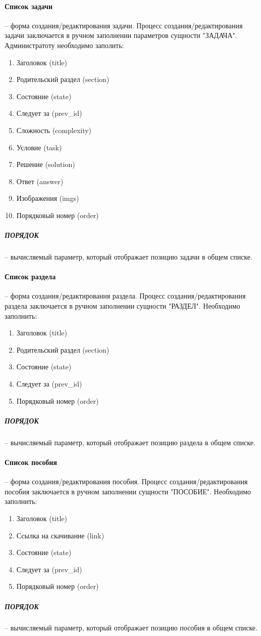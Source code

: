 \paragraph{Список задачи} -- форма создания/редактирования задачи.
Процесс создания/редактирования задачи заключается в ручном заполнении параметров сущности "ЗАДАЧА". Администратоту необходимо заполить:
\begin{enumerate}
  \item Заголовок (title)
  \item Родительский раздел (section)
  \item Состояние (state)
  \item Следует за (prev\_id)
  \item Сложность (complexity)
  \item Условие (task)
  \item Решение (solution)
  \item Ответ (answer)
  \item Изображения (imgs)
  \item Порядковый номер (order)
\end{enumerate}
\subparagraph{ПОРЯДОК} -- вычисляемый параметр, который отображает позицию задачи в общем списке.

\paragraph{Список раздела} -- форма создания/редактирования раздела.
Процесс создания/редактирования раздела заключается в ручном заполнении сущности "РАЗДЕЛ".
Необходимо заполнить:
\begin{enumerate}
  \item Заголовок (title)
  \item Родительский раздел (section)
  \item Состояние (state)
  \item Следует за (prev\_id)
  \item Порядковый номер (order)
\end{enumerate}
\subparagraph{ПОРЯДОК} -- вычисляемый параметр, который отображает позицию раздела в общем списке.

\paragraph{Список пособия} -- форма создания/редактирования пособия.
Процесс создания/редактирования пособия заключается в ручном заполнении сущности "ПОСОБИЕ".
Необходимо заполнить:
\begin{enumerate}
  \item Заголовок (title)
  \item Ссылка на скачивание (link)
  \item Состояние (state)
  \item Следует за (prev\_id)
  \item Порядковый номер (order)
\end{enumerate}
\subparagraph{ПОРЯДОК} -- вычисляемый параметр, который отображает позицию пособия в общем списке.

